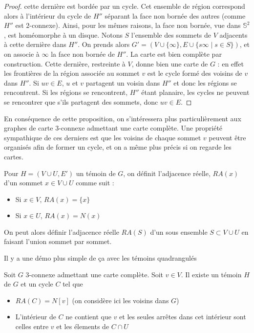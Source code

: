 \documentclass{scrartcl}
\begin{document}
\begin{flushleft}
\begin{proof}
    cette dernière est bordée par un cycle. Cet ensemble de région correspond alors à l'intérieur du cycle de $H''$
    séparant la face non bornée des autres (comme $H''$ est $2$-connexe). Ainsi, pour les mêmes raisons, la face non bornée, vue dans $\mathbb{S}^2$,
    est homéomorphe à un disque. Notons $S$ l'ensemble des sommets de $V$ adjacents à cette dernière dans $H''$.
    On prends alors $G' = (V \cup \{\infty\}, E \cup \{s\infty \mid s \in S \} )$, et on associe à $\infty$ la face non bornée de $H''$.
    La carte est bien complète par construction. Cette dernière, restreinte à $V$, donne bien une carte de $G$ : en effet les frontières
    de la région associée au sommet $v$ est le cycle formé des voisins de $v$ dans $H''$. Si $uv \in E$, $u$ et $v$ partagent un voisin
    dans $H''$ et donc les régions se rencontrent. Si les régions se rencontrent, $H''$ étant planaire, les cycles ne peuvent se rencontrer
    que s'ils partagent des sommets, donc $uv \in E$.

\end{proof}

En conséquence de cette proposition, on s'intéressera plus particulièrement aux graphes de carte $3$-connexe admettant une carte complète.
Une propriété sympathique de ces derniers est que les voisins de chaque sommet $v$ peuvent être organisés afin
de former un cycle, et on a même plus précis si on regarde les cartes.

\begin{def*}
    Pour $H = (V \cup U, E')$ un témoin de $G$, on définit l'adjacence réelle, $RA(x)$ d'un sommet $x \in V \cup U$ comme suit :
    \begin{itemize}
        \item Si $x \in V$, $RA(x) = \{x\}$
        \item Si $x \in U$, $RA(x) = N(x)$
    \end{itemize}
    On peut alors définir l'adjacence réelle $RA(S)$ d'un sous ensemble $S \subset V \cup U$ en faisant l'union sommet par sommet.
\end{def*}

Il y a une démo plus simple de ça avec les témoins quadrangulés

\begin{prop}\label{cyclSep}
    Soit $G$ $3$-connexe admettant une carte complète. Soit $v \in V$. Il existe un témoin $H$ de $G$ et
    un cycle $C$ tel que
    \begin{itemize}
        \item $RA(C) = N[v]$ (on considère ici les voisins dans $G$)
        \item L'intérieur de $C$ ne contient que $v$ et les seules arrêtes dans cet intérieur sont celles entre $v$ et
        les élements de $C \cap U$
    \end{itemize}
\end{prop}


\end{flushleft}
\end{document}
